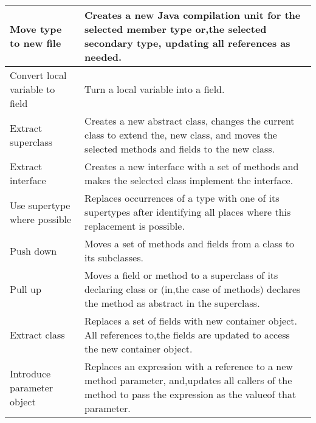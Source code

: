 \begin{table}[h]
\begin{tabular}{p{3cm} p{11 cm}}
Move type to new file               & Creates a new Java compilation unit for the selected member type or,the selected secondary type, updating all references as needed.                                                                       \\ \hline
Convert local variable to field     & Turn a local variable into a field.                                                                                                                                                                       \\ \hline
Extract superclass                  & Creates a new abstract class, changes the current class to extend the, new class, and moves the selected methods and fields to the new class.                                                             \\ \hline
Extract interface                   & Creates a new interface with a set of methods and makes the selected class implement the interface.                                                                                                       \\ \hline
Use supertype where possible        & Replaces occurrences of a type with one of its supertypes after identifying all places where this replacement is possible.                                                                                \\ \hline
Push down                           & Moves a set of methods and fields from a class to its subclasses.                                                                                                                                         \\ \hline
Pull up                             & Moves a field or method to a superclass of its declaring class or (in,the case of methods) declares the method as abstract in the superclass.                                                             \\ \hline
Extract class                       & Replaces a set of fields with new container object. All references to,the fields are updated to access the new container object.                                                                          \\ \hline
Introduce parameter object          & Replaces an expression with a reference to a new method parameter, and,updates all callers of the method to pass the expression as the valueof that parameter.                                            \\ \hline

\end{tabular}
\end{table}
